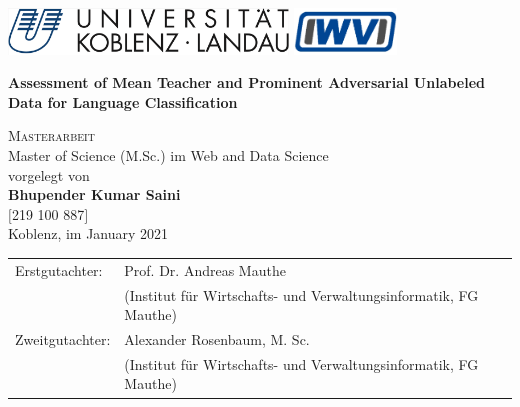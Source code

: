 
\begin{titlepage}
	\includegraphics[height=35pt]{img/uni-logo.png}
	\hfill
	\includegraphics[height=35pt]{img/iwvi.jpg}

	\begin{center}
	\vspace{2.5cm}	
	
	\huge\textbf{Assessment of Mean Teacher and Prominent Adversarial Unlabeled Data for Language Classification}
	


	\normalsize
	\vspace{1.5cm}	

	\textsc{\Large Masterarbeit}\\Master of Science (M.Sc.) im Web and Data Science\\[2cm] 
		
	vorgelegt von\\
	
	\textbf{\Large Bhupender Kumar Saini}\\ $ [ $219 100 887$ ] $\\ [1.5cm] 
	
	Koblenz, im January 2021 
	\end{center}
	\vfill
	\begin{tabular}{ll}
		Erstgutachter: & Prof. Dr. Andreas Mauthe\\ 
		 & \small{(Institut f\"ur Wirtschafts- und Verwaltungsinformatik, FG Mauthe)}\\
		Zweitgutachter: & Alexander Rosenbaum, M. Sc. \\ 
		& \small{(Institut f\"ur Wirtschafts- und Verwaltungsinformatik, FG Mauthe)}\\
	\end{tabular}
\end{titlepage}
